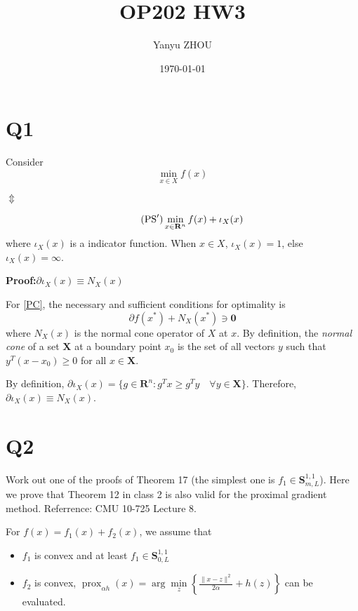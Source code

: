 \documentclass[12pt]{article}
\title{OP202 HW3}
\author{Yanyu ZHOU}
\date{\today}
\theoremstyle{mystyle}
\begin{document}
\maketitle
\section{Q1}
Consider
\begin{equation} \label{PC}
\tag{$PC$} 
    \min _{x \in X} f(x)
\end{equation}
\begin{center}
    $\Updownarrow$
\end{center}
\begin{equation}
    \tag{$\mathrm{PS}^{\prime}$}
    \min _{x \in \mathbf{R}^n} f(x)+\iota_X(x)
\end{equation}
where $\iota_X(x)$ is a indicator function. When $x\in X$, $\iota_X(x) = 1$, else $\iota_X(x) = \infty$.

\textbf{Proof:}$\partial \iota_X(x) \equiv N_X(x)$

For \eqref{PC}, the necessary and sufficient conditions for optimality is
$$
\partial f\left(x^*\right)+N_X\left(x^*\right) \ni \mathbf{0}
$$
where $N_X(x)$ is the normal cone operator of $X$ at $x$. By definition, the \textit{normal cone} of a set $\mathbf{X}$ at a boundary point $x_0$ is the set of all vectors
$y$ such that $y^T(x-x_0) \geq 0$ for all $x \in \mathbf{X}$.

By definition, $\partial \iota_X(x) = \{g \in \mathbf{R}^n: g^Tx \geq g^Ty \quad \forall y\in \mathbf{X} \}$.
Therefore, $\partial \iota_X(x) \equiv N_X(x)$.

\section{Q2}
Work out one of the proofs of Theorem 17 (the simplest one is $f_1 \in \mathbf{S}^{1,1}_{m,L}$).
Here we prove that Theorem 12 in class 2 is also valid for the proximal gradient method. Referrence: CMU 10-725 Lecture 8.

For $f(x) = f_1(x) + f_2(x)$, we assume that 
\begin{itemize}
    \item $f_1$ is convex and at least $f_1 \in \mathbf{S}^{1,1}_{0,L}$
    \item $f_2$ is convex, $\operatorname{prox}_{\alpha h} (x)=\arg \min\limits_z\left\{\frac{\|x-z\|^2}{2 \alpha}+h(z)\right\}$ can be evaluated.
\end{itemize}
\end{document}

